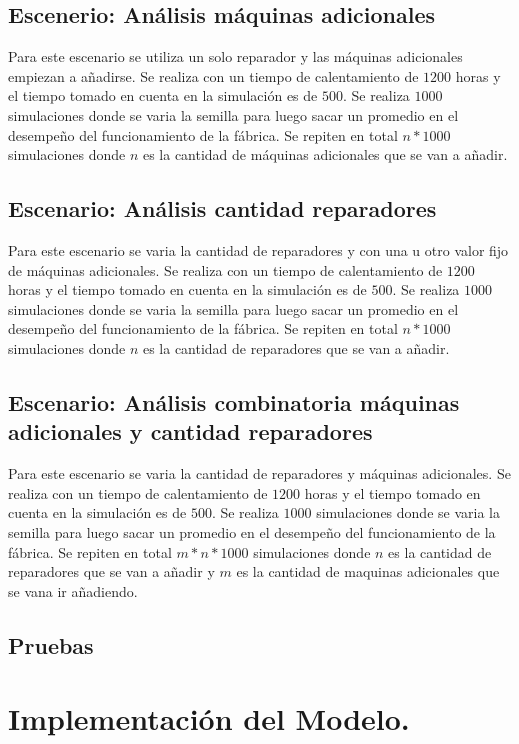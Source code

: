\documentclass[12pt]{article}
\begin{document}
\subsection{Escenerio: An\'alisis m\'aquinas adicionales}

Para este escenario se utiliza un solo reparador y las máquinas adicionales empiezan a añadirse. Se realiza con un tiempo de calentamiento de $1200$ horas y el tiempo tomado en cuenta en la simulación es de $500$. Se realiza $1000$ simulaciones donde se varia la semilla para luego sacar un promedio en el desempeño del funcionamiento de la fábrica. Se repiten en total $n*1000$ simulaciones donde $n$ es la cantidad de máquinas adicionales que se van a añadir.

\subsection{Escenario: An\'alisis cantidad reparadores}

Para este escenario se varia la cantidad de reparadores y con una u otro valor fijo de máquinas adicionales. Se realiza con un tiempo de calentamiento de $1200$ horas y el tiempo tomado en cuenta en la simulación es de $500$. Se realiza $1000$ simulaciones donde se varia la semilla para luego sacar un promedio en el desempeño del funcionamiento de la fábrica. Se repiten en total $n*1000$ simulaciones donde $n$ es la cantidad de reparadores que se van a añadir.

\subsection{Escenario: An\'alisis combinatoria m\'aquinas adicionales y cantidad reparadores}

Para este escenario se varia la cantidad de reparadores y máquinas adicionales. Se realiza con un tiempo de calentamiento de $1200$ horas y el tiempo tomado en cuenta en la simulación es de $500$. Se realiza $1000$ simulaciones donde se varia la semilla para luego sacar un promedio en el desempeño del funcionamiento de la fábrica. Se repiten en total $m*n*1000$ simulaciones donde $n$ es la cantidad de reparadores que se van a añadir y $m$ es la cantidad de maquinas adicionales que se vana ir añadiendo.


\subsection{Pruebas}

\section{Implementación del Modelo.}
\end{document}
